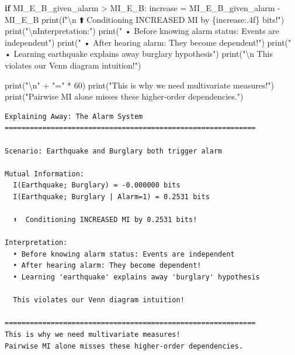 \documentclass[
  11pt,
  letterpaper,
  oneside,
  openany]{book}
\newenvironment{Shaded}{\begin{snugshade}}{\end{snugshade}}
\newcommand{\BuiltInTok}[1]{\textcolor[rgb]{0.00,0.23,0.31}{#1}}
\newcommand{\CharTok}[1]{\textcolor[rgb]{0.13,0.47,0.30}{#1}}
\newcommand{\ControlFlowTok}[1]{\textcolor[rgb]{0.00,0.23,0.31}{\textbf{#1}}}
\newcommand{\DecValTok}[1]{\textcolor[rgb]{0.68,0.00,0.00}{#1}}
\newcommand{\NormalTok}[1]{\textcolor[rgb]{0.00,0.23,0.31}{#1}}
\newcommand{\OperatorTok}[1]{\textcolor[rgb]{0.37,0.37,0.37}{#1}}
\newcommand{\SpecialCharTok}[1]{\textcolor[rgb]{0.37,0.37,0.37}{#1}}
\newcommand{\SpecialStringTok}[1]{\textcolor[rgb]{0.13,0.47,0.30}{#1}}
\newcommand{\StringTok}[1]{\textcolor[rgb]{0.13,0.47,0.30}{#1}}
\begin{document}
\begin{Shaded}
\begin{Highlighting}[]
\ControlFlowTok{if}\NormalTok{ MI\_E\_B\_given\_alarm }\OperatorTok{\textgreater{}}\NormalTok{ MI\_E\_B:}
\NormalTok{    increase }\OperatorTok{=}\NormalTok{ MI\_E\_B\_given\_alarm }\OperatorTok{{-}}\NormalTok{ MI\_E\_B}
    \BuiltInTok{print}\NormalTok{(}\SpecialStringTok{f"}\CharTok{\textbackslash{}n}\SpecialStringTok{  ⬆️  Conditioning INCREASED MI by }\SpecialCharTok{\{}\NormalTok{increase}\SpecialCharTok{:.4f\}}\SpecialStringTok{ bits!"}\NormalTok{)}
    \BuiltInTok{print}\NormalTok{(}\StringTok{"}\CharTok{\textbackslash{}n}\StringTok{Interpretation:"}\NormalTok{)}
    \BuiltInTok{print}\NormalTok{(}\StringTok{"  • Before knowing alarm status: Events are independent"}\NormalTok{)}
    \BuiltInTok{print}\NormalTok{(}\StringTok{"  • After hearing alarm: They become dependent!"}\NormalTok{)}
    \BuiltInTok{print}\NormalTok{(}\StringTok{"  • Learning \textquotesingle{}earthquake\textquotesingle{} explains away \textquotesingle{}burglary\textquotesingle{} hypothesis"}\NormalTok{)}
    \BuiltInTok{print}\NormalTok{(}\StringTok{"}\CharTok{\textbackslash{}n}\StringTok{  This violates our Venn diagram intuition!"}\NormalTok{)}

\BuiltInTok{print}\NormalTok{(}\StringTok{"}\CharTok{\textbackslash{}n}\StringTok{"} \OperatorTok{+} \StringTok{"="} \OperatorTok{*} \DecValTok{60}\NormalTok{)}
\BuiltInTok{print}\NormalTok{(}\StringTok{"This is why we need multivariate measures!"}\NormalTok{)}
\BuiltInTok{print}\NormalTok{(}\StringTok{"Pairwise MI alone misses these higher{-}order dependencies."}\NormalTok{)}
\end{Highlighting}
\end{Shaded}

\begin{verbatim}
Explaining Away: The Alarm System
============================================================

Scenario: Earthquake and Burglary both trigger alarm

Mutual Information:
  I(Earthquake; Burglary) = -0.000000 bits
  I(Earthquake; Burglary | Alarm=1) = 0.2531 bits

  ⬆️  Conditioning INCREASED MI by 0.2531 bits!

Interpretation:
  • Before knowing alarm status: Events are independent
  • After hearing alarm: They become dependent!
  • Learning 'earthquake' explains away 'burglary' hypothesis

  This violates our Venn diagram intuition!

============================================================
This is why we need multivariate measures!
Pairwise MI alone misses these higher-order dependencies.
\end{verbatim}
\end{document}
